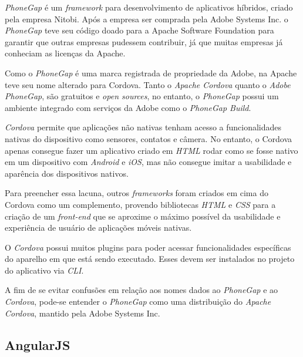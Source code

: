 \textit{PhoneGap} é um \textit{framework} para desenvolvimento de aplicativos híbridos, criado pela empresa Nitobi. 
Após a empresa ser comprada pela Adobe Systems Inc. o \textit{PhoneGap} teve seu código doado para a Apache Software Foundation 
para garantir que outras empresas pudessem contribuir, já que muitas empresas já conheciam as licenças da Apache.


Como o \textit{PhoneGap} é uma marca registrada de propriedade da Adobe, na Apache teve seu nome alterado para Cordova.
Tanto o \textit{Apache Cordova} quanto o \textit{Adobe PhoneGap}, são gratuitos e \textit{open sources}, no entanto, o 
\textit{PhoneGap} possui um ambiente integrado com serviços da Adobe como o \textit{PhoneGap Build}.
 
\textit{Cordova} permite que aplicações não nativas tenham acesso a funcionalidades nativas do dispositivo como sensores, 
contatos e câmera. No entanto, o Cordova apenas consegue fazer um aplicativo criado em 
\textit{HTML} rodar como se fosse nativo em um dispositivo com \textit{Android} e \textit{iOS}, mas não consegue 
imitar a usabilidade e aparência dos dispositivos nativos. 


Para preencher essa lacuna, outros \textit{frameworks} foram criados em cima do Cordova como um complemento, 
provendo bibliotecas \textit{HTML} e \textit{CSS} para a 
criação de um \textit{front-end} que se aproxime o máximo possível da usabilidade e experiência de usuário de 
aplicações móveis nativas.

O \textit{Cordova} possui muitos plugins para poder acessar funcionalidades específicas do aparelho em que está sendo 
executado. Esses devem ser instalados no projeto do aplicativo via \textit{CLI}. 

A fim de se evitar confusões em relação aos nomes dados ao \textit{PhoneGap} e ao \textit{Cordova}, pode-se entender o \textit{PhoneGap} 
como uma distribuição do \textit{Apache Cordova}, mantido pela Adobe Systems Inc. 


\subsection{AngularJS} \label{subsec:angularjs}

